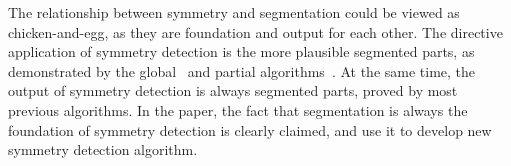 The relationship between symmetry and segmentation could be viewed as chicken-and-egg, as they are foundation and output for each other. 
The directive application of symmetry detection is the more plausible segmented parts, as demonstrated by the global~\cite{podolak2006,podolak2007} and partial algorithms~\cite{xu2009,lipman2010}.
At the same time, the output of symmetry detection is always segmented parts, proved by most previous algorithms.
In the paper, the fact that segmentation is always the foundation of symmetry detection is clearly claimed, and use it to develop new symmetry detection algorithm. 

